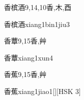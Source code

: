 \begin{Entry}{香槟酒}{9,14,10}{⾹,⽊,⾣}
  \begin{Phonetics}{香槟酒}{xiang1bin1jiu3}
  \end{Phonetics}
\end{Entry}

\begin{Entry}{香蕈}{9,15}{⾹,⾋}
  \begin{Phonetics}{香蕈}{xiang1xun4}
  \end{Phonetics}
\end{Entry}

\begin{Entry}{香蕉}{9,15}{⾹,⾋}
  \begin{Phonetics}{香蕉}{xiang1jiao1}[][HSK 3]
  \end{Phonetics}
\end{Entry}


